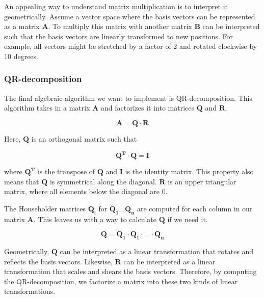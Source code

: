 An appealing way to understand matrix multiplication is to interpret it geometrically. Assume a vector space where the basis vectors can be represented as a matrix $\mathbf{A}$. To multiply this matrix with another matrix $\mathbf{B}$ can be interpreted such that the basis vectors are linearly transformed to new positions. For example, all vectors might be stretched by a factor of 2 and rotated clockwise by 10 degrees. 

\subsubsection{QR-decomposition}
The final algebraic algorithm we want to implement is QR-decomposition. This algorithm takes in a matrix \(\mathbf{A}\) and factorizes it into matrices \(\mathbf{Q}\) and \(\mathbf{R}\).

\[\mathbf{A} = \mathbf{Q} \cdot \mathbf{R}\]

\noindent Here, \(\mathbf{Q}\) is an orthogonal matrix such that 

\[\mathbf{Q^T \cdot Q = I}\]

where \(\mathbf{Q^T}\) is the transpose of \(\mathbf{Q}\) and \(\mathbf{I}\) is the identity matrix. This property also means that \(\mathbf{Q}\) is symmetrical along the diagonal. \(\mathbf{R}\) is an upper triangular matrix, where all elements below the diagonal are 0. 


The Householder matrices \(\mathbf{Q_i}\) for \(\mathbf{Q_1 \ldots Q_{n}}\) are computed for each column in our matrix \(\mathbf{A}\). This leaves us with a way to calculate \(\mathbf{Q}\) if we need it.\cite[Sect. 2.13, 11.2]{numericalrecipes}

\[\mathbf{Q = Q_1 \cdot Q_1 \cdot \ldots \cdot Q_{n}}\]


Geometrically, \(\mathbf{Q}\) can be interpreted as a linear transformation that rotates and reflects the basis vectors. Likewise, \(\mathbf{R}\) can be interpreted as a linear transformation that scales and shears the basis vectors. Therefore, by computing the QR-decomposition, we factorize a matrix into these two kinds of linear transformations. 


